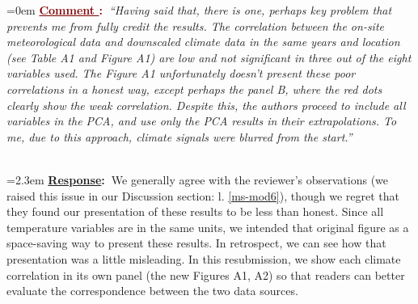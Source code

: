 \documentclass[12pt]{article}
\newcounter{cN}
\newcommand{\comment}[1]{
	\vspace{2em}
	\refstepcounter{cN} %
	\noindent \hangindent=0em \textbf{\textcolor{Maroon}{\uline{Comment \thecN}:~}}\emph{``#1''}
	}
\newcommand{\response}[1]{
	\\[0.25em]
	\hangindent=2.3em \textbf{\textcolor{NavyBlue}{\uline{Response}:~}}#1
	}
\begin{document}
\comment{Having said that, there is one, perhaps key problem that prevents me from fully credit the results. 
The correlation between the on-site meteorological data and downscaled climate data in the same years and location (see Table A1 and Figure A1) are low and not significant in three out of the eight variables used. 
The Figure A1 unfortunately doesn't present these poor correlations in a honest way, except perhaps the panel B, where the red dots clearly show the weak correlation. Despite this, the authors proceed to include all variables in the PCA, and use only the PCA results in their extrapolations. 
To me, due to this approach, climate signals were blurred from the start.}
\response{We generally agree with the reviewer's observations (we raised this issue in our Discussion section: l. \ref{ms-mod6}), though we regret that they found our presentation of these results to be less than honest.
Since all temperature variables are in the same units, we intended that original figure as a space-saving way to present these results.
In retrospect, we can see how that presentation was a little misleading. 
In this resubmission, we show each climate correlation in its own panel (the new Figures A1, A2) so that readers can better evaluate the correspondence between the two data sources. 
}
\end{document}
